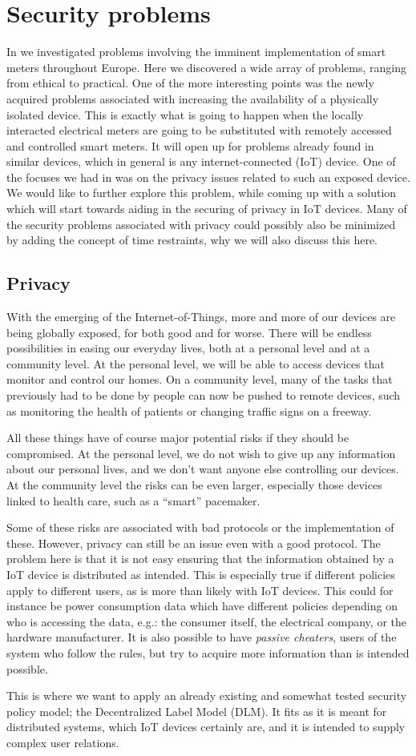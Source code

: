 
\section{Security problems}
In \cite{prespecialization} we investigated problems involving the imminent implementation of smart meters throughout Europe.
Here we discovered a wide array of problems, ranging from ethical to practical.
One of the more interesting points was the newly acquired problems associated with increasing the availability of a physically isolated device.
This is exactly what is going to happen when the locally interacted electrical meters are going to be substituted with remotely accessed and controlled smart meters.
It will open up for problems already found in similar devices, which in general is any internet-connected (IoT) device.
One of the focuses we had in \cite{prespecialization} was on the privacy issues related to such an exposed device.
We would like to further explore this problem, while coming up with a solution which will start towards aiding in the securing of privacy in IoT devices.
Many of the security problems associated with privacy could possibly also be minimized by adding the concept of time restraints, why we will also discuss this here.

\subsection{Privacy}
With the emerging of the Internet-of-Things, more and more of our devices are being globally exposed, for both good and for worse.
There will be endless possibilities in easing our everyday lives, both at a personal level and at a community level.
At the personal level, we will be able to access devices that monitor and control our homes.
On a community level, many of the tasks that previously had to be done by people can now be pushed to remote devices, such as monitoring the health of patients or changing traffic signs on a freeway.

All these things have of course major potential risks if they should be compromised.
At the personal level, we do not wish to give up any information about our personal lives, and we don't want anyone else controlling our devices.
At the community level the risks can be even larger, especially those devices linked to health care, such as a ``smart'' pacemaker.

Some of these risks are associated with bad protocols or the implementation of these.
However, privacy can still be an issue even with a good protocol.
The problem here is that it is not easy ensuring that the information obtained by a IoT device is distributed as intended.
This is especially true if different policies apply to different users, as is more than likely with IoT devices.
This could for instance be power consumption data which have different policies depending on who is accessing the data, e.g.: the consumer itself, the electrical company, or the hardware manufacturer.
It is also possible to have \emph{passive cheaters}, users of the system who follow the rules, but try to acquire more information than is intended possible.

This is where we want to apply an already existing and somewhat tested security policy model; the Decentralized Label Model (DLM).
It fits as it is meant for distributed systems, which IoT devices certainly are, and it is intended to supply complex user relations.
